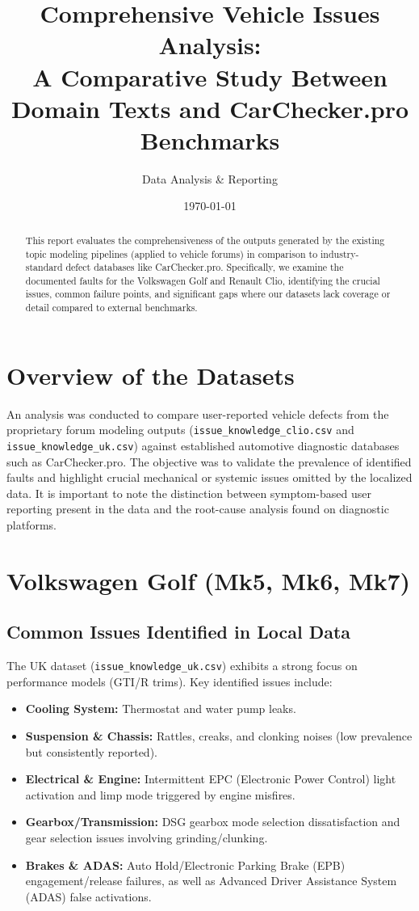 \documentclass[11pt,a4paper]{article}
\title{\textbf{Comprehensive Vehicle Issues Analysis:} \\ 
A Comparative Study Between Domain Texts and CarChecker.pro Benchmarks}
\author{Data Analysis \& Reporting}
\date{\today}
\begin{document}
\maketitle

\begin{abstract}
This report evaluates the comprehensiveness of the outputs generated by the existing topic modeling pipelines (applied to vehicle forums) in comparison to industry-standard defect databases like CarChecker.pro. Specifically, we examine the documented faults for the Volkswagen Golf and Renault Clio, identifying the crucial issues, common failure points, and significant gaps where our datasets lack coverage or detail compared to external benchmarks.
\end{abstract}

\section{Overview of the Datasets}
An analysis was conducted to compare user-reported vehicle defects from the proprietary forum modeling outputs (\texttt{issue\_knowledge\_clio.csv} and \texttt{issue\_knowledge\_uk.csv}) against established automotive diagnostic databases such as CarChecker.pro. The objective was to validate the prevalence of identified faults and highlight crucial mechanical or systemic issues omitted by the localized data. It is important to note the distinction between symptom-based user reporting present in the data and the root-cause analysis found on diagnostic platforms.

\section{Volkswagen Golf (Mk5, Mk6, Mk7)}

\subsection{Common Issues Identified in Local Data}
The UK dataset (\texttt{issue\_knowledge\_uk.csv}) exhibits a strong focus on performance models (GTI/R trims). Key identified issues include:
\begin{itemize}
    \item \textbf{Cooling System:} Thermostat and water pump leaks.
    \item \textbf{Suspension \& Chassis:} Rattles, creaks, and clonking noises (low prevalence but consistently reported).
    \item \textbf{Electrical \& Engine:} Intermittent EPC (Electronic Power Control) light activation and limp mode triggered by engine misfires.
    \item \textbf{Gearbox/Transmission:} DSG gearbox mode selection dissatisfaction and gear selection issues involving grinding/clunking.
    \item \textbf{Brakes \& ADAS:} Auto Hold/Electronic Parking Brake (EPB) engagement/release failures, as well as Advanced Driver Assistance System (ADAS) false activations.
\end{itemize}
\end{document}
